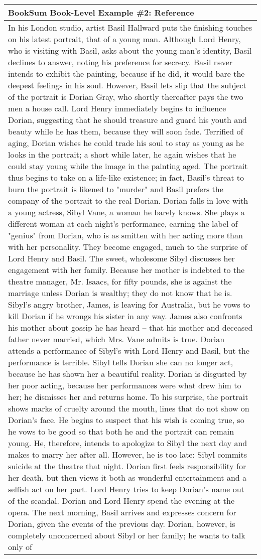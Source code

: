 \begin{table}[!htbp]
    \centering
    \tiny    
    \begin{tabular}{p{\linewidth}} 
    \midrule
    \textbf{BookSum Book-Level Example \#2: Reference} \\
    \midrule
In his London studio, artist Basil Hallward puts the finishing touches on his latest portrait, that of a young man. Although Lord Henry, who is visiting with Basil, asks about the young man's identity, Basil declines to answer, noting his preference for secrecy. Basil never intends to exhibit the painting, because if he did, it would bare the deepest feelings in his soul. However, Basil lets slip that the subject of the portrait is Dorian Gray, who shortly thereafter pays the two men a house call. Lord Henry immediately begins to influence Dorian, suggesting that he should treasure and guard his youth and beauty while he has them, because they will soon fade. Terrified of aging, Dorian wishes he could trade his soul to stay as young as he looks in the portrait; a short while later, he again wishes that he could stay young while the image in the painting aged. The portrait thus begins to take on a life-like existence; in fact, Basil's threat to burn the portrait is likened to "murder" and Basil prefers the company of the portrait to the real Dorian. Dorian falls in love with a young actress, Sibyl Vane, a woman he barely knows. She plays a different woman at each night's performance, earning the label of "genius" from Dorian, who is as smitten with her acting more than with her personality. They become engaged, much to the surprise of Lord Henry and Basil. The sweet, wholesome Sibyl discusses her engagement with her family. Because her mother is indebted to the theatre manager, Mr. Isaacs, for fifty pounds, she is against the marriage unless Dorian is wealthy; they do not know that he is. Sibyl's angry brother, James, is leaving for Australia, but he vows to kill Dorian if he wrongs his sister in any way. James also confronts his mother about gossip he has heard -- that his mother and deceased father never married, which Mrs. Vane admits is true. Dorian attends a performance of Sibyl's with Lord Henry and Basil, but the performance is terrible. Sibyl tells Dorian she can no longer act, because he has shown her a beautiful reality. Dorian is disgusted by her poor acting, because her performances were what drew him to her; he dismisses her and returns home. To his surprise, the portrait shows marks of cruelty around the mouth, lines that do not show on Dorian's face. He begins to suspect that his wish is coming true, so he vows to be good so that both he and the portrait can remain young. He, therefore, intends to apologize to Sibyl the next day and makes to marry her after all. However, he is too late: Sibyl commits suicide at the theatre that night. Dorian first feels responsibility for her death, but then views it both as wonderful entertainment and a selfish act on her part. Lord Henry tries to keep Dorian's name out of the scandal. Dorian and Lord Henry spend the evening at the opera. The next morning, Basil arrives and expresses concern for Dorian, given the events of the previous day. Dorian, however, is completely unconcerned about Sibyl or her family; he wants to talk only of 
\end{tabular}
\end{table}
